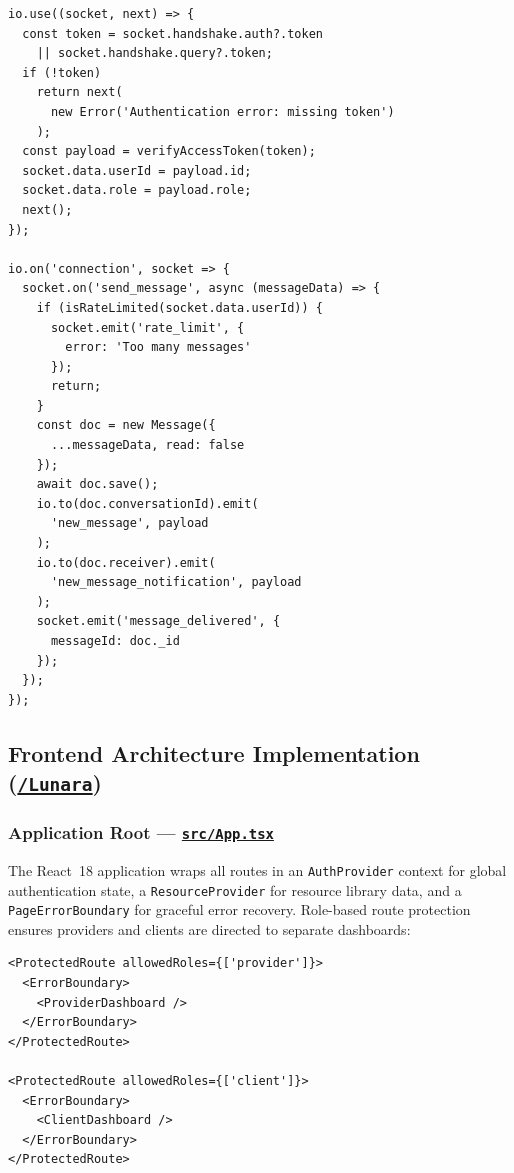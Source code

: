 \documentclass[12pt,letterpaper]{article}
\newcommand{\ghrepo}{https://github.com/omniV1/lunaraCare}
\begin{document}
\begin{lstlisting}[caption={Socket.IO authentication and message delivery (\texttt{server.ts})}]
io.use((socket, next) => {
  const token = socket.handshake.auth?.token
    || socket.handshake.query?.token;
  if (!token)
    return next(
      new Error('Authentication error: missing token')
    );
  const payload = verifyAccessToken(token);
  socket.data.userId = payload.id;
  socket.data.role = payload.role;
  next();
});

io.on('connection', socket => {
  socket.on('send_message', async (messageData) => {
    if (isRateLimited(socket.data.userId)) {
      socket.emit('rate_limit', {
        error: 'Too many messages'
      });
      return;
    }
    const doc = new Message({
      ...messageData, read: false
    });
    await doc.save();
    io.to(doc.conversationId).emit(
      'new_message', payload
    );
    io.to(doc.receiver).emit(
      'new_message_notification', payload
    );
    socket.emit('message_delivered', {
      messageId: doc._id
    });
  });
});
\end{lstlisting}

\subsection{Frontend Architecture Implementation (\href{\ghrepo/tree/main/Lunara}{\texttt{/Lunara}})}

\subsubsection{Application Root --- \href{\ghrepo/blob/main/Lunara/src/App.tsx}{\texttt{src/App.tsx}}}

The React~18 application wraps all routes in an \texttt{AuthProvider} context for global authentication state, a \texttt{ResourceProvider} for resource library data, and a \texttt{PageErrorBoundary} for graceful error recovery. Role-based route protection ensures providers and clients are directed to separate dashboards:

\begin{lstlisting}[caption={Role-based route protection (\texttt{App.tsx})}]
<ProtectedRoute allowedRoles={['provider']}>
  <ErrorBoundary>
    <ProviderDashboard />
  </ErrorBoundary>
</ProtectedRoute>

<ProtectedRoute allowedRoles={['client']}>
  <ErrorBoundary>
    <ClientDashboard />
  </ErrorBoundary>
</ProtectedRoute>
\end{lstlisting}
\end{document}
